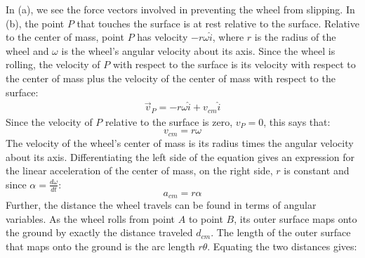 \documentclass[a4paper]{article}
\newcommand\der[2]{\frac{d #1}{d #2}}
\begin{document}
\begin{center}
\end{center}
In (a), we see the force vectors involved in preventing the wheel from slipping. In (b), the point $P$ that touches the surface is at rest relative to the surface. Relative to the center of mass, point $P$ has velocity $-r\omega\hat{i}$, where $r$ is the radius of the wheel and $\omega$ is the wheel's angular velocity about its axis. Since the wheel is rolling, the velocity of $P$ with respect to the surface is its velocity with respect to the center of mass plus the velocity of the center of mass with respect to the surface:
\begin{align*}
    \vec{v}_P = -r\omega\hat{i} + v_{cm}\hat{i}
\end{align*}
Since the velocity of $P$ relative to the surface is zero, $v_P = 0$, this says that:
\begin{equation}
    v_{cm} = r\omega
\end{equation}
The velocity of the wheel's center of mass is its radius times the angular velocity about its axis. Differentiating the left side of the equation gives an expression for the linear acceleration of the center of mass, on the right side, $r$ is constant and since $\alpha = \der{\omega}{t}$:
\begin{equation}
    a_{cm} = r\alpha
\end{equation}
Further, the distance the wheel travels can be found in terms of angular variables. As the wheel rolls from point $A$ to point $B$, its outer surface maps onto the ground by exactly the distance traveled $d_{cm}$. The length of the outer surface that maps onto the ground is the arc length $r\theta$. Equating the two distances gives:
\end{document}
